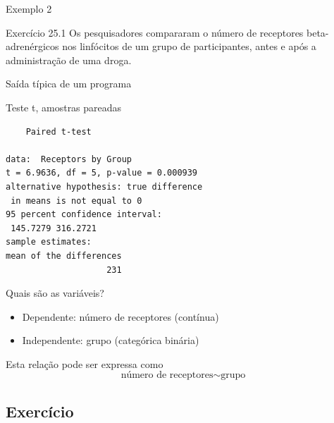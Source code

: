 \documentclass{beamer}
\begin{document}
\begin{frame}{\scriptsize Exemplo 2}
  \begin{exampleblock}{Exercício 25.1}
    \footnotesize
    Os pesquisadores compararam o número de receptores beta-adrenérgicos nos linfócitos de um grupo de participantes, antes e após a administração de uma droga.

  \end{exampleblock}
\end{frame}

\begin{frame}[fragile]{\scriptsize Saída típica de um programa}
  \begin{exampleblock}{Teste t, amostras pareadas}
    \tiny
\begin{verbatim}
	Paired t-test

data:  Receptors by Group
t = 6.9636, df = 5, p-value = 0.000939
alternative hypothesis: true difference
 in means is not equal to 0
95 percent confidence interval:
 145.7279 316.2721
sample estimates:
mean of the differences 
                    231
\end{verbatim}
  \end{exampleblock}
\end{frame}

\begin{frame}{\scriptsize Quais são as variáveis?}
  \begin{itemize}
    \footnotesize
  \item Dependente: número de receptores (contínua)
  \item Independente: grupo (categórica binária)
  \end{itemize}
  \vfill
  \begin{block}{Esta relação pode ser expressa como}
    \begin{displaymath}
      \text{número de receptores} \sim \text{grupo}
    \end{displaymath}
  \end{block}
\end{frame}

\subsection{Exercício}
\end{document}
